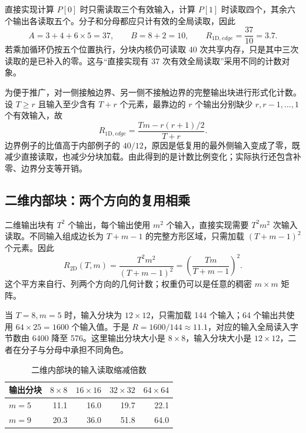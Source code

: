 直接实现计算 $P[0]$ 时只需读取三个有效输入，计算 $P[1]$ 时读取四个，其余六个输出各读取五个。分子和分母都应只计有效的全局读取，因此
\begin{equation}
 A=3+4+6\times5=37,\qquad B=8+2=10,
 \qquad R_{1\mathrm D,edge}=\frac{37}{10}=3.7.
 \label{l9:eq:boundary1d-example}
\end{equation}
若乘加循环仍按五个位置执行，分块内核仍可读取 40 次共享内存，只是其中三次读取的是已补入的零。这与“直接实现有 37 次有效全局读取”采用不同的计数对象。

为便于推广，对一侧接触边界、另一侧不接触边界的完整输出块进行形式化计数。设 $T\ge r$ 且输入至少含有 $T+r$ 个元素，最靠边的 $r$ 个输出分别缺少 $r,r-1,\ldots,1$ 个有效输入，故
\begin{equation}
 R_{1\mathrm D,edge}
 =\frac{Tm-r(r+1)/2}{T+r}.
 \label{l9:eq:boundary1d-general}
\end{equation}
边界例子的比值高于内部例子的 $40/12$，原因是低复用的最外侧输入变成了零，既减少直接读取，也减少分块加载。由此得到的是计数比例变化；实际执行还包含补零、边界分支等开销。

\subsection{二维内部块：两个方向的复用相乘}
二维输出块有 $T^2$ 个输出，每个输出使用 $m^2$ 个输入，直接实现需要 $T^2m^2$ 次输入读取。不同输入组成边长为 $T+m-1$ 的完整方形区域，只需加载 $(T+m-1)^2$ 个元素。因此
\begin{equation}
 R_{2\mathrm D}(T,m)
 =\frac{T^2m^2}{(T+m-1)^2}
 =\left(\frac{Tm}{T+m-1}\right)^2.
 \label{l9:eq:reuse2d}
\end{equation}
这个平方来自行、列两个方向的几何计数；权重仍可以是任意的稠密 $m\times m$ 矩阵。

当 $T=8,m=5$ 时，输入分块为 $12\times12$，只需加载 144 个输入；64 个输出共使用 $64\times25=1600$ 个输入值。于是 $R=1600/144\approx11.1$，对应的输入全局读入字节数由 6400 降至 576。这里输出分块大小是 $8\times8$，输入分块大小是 $12\times12$，二者在分子与分母中承担不同角色。

\begin{table}[htbp]
\centering\small
\caption{二维内部块的输入读取缩减倍数}
\label{l9:tab:reuse2d}
\begin{tabular}{@{}lrrrr@{}}\toprule
输出分块 & $8\times8$ & $16\times16$ & $32\times32$ & $64\times64$\\\midrule
$m=5$ & 11.1 & 16.0 & 19.7 & 22.1\\
$m=9$ & 20.3 & 36.0 & 51.8 & 64.0\\\bottomrule
\end{tabular}
\end{table}

